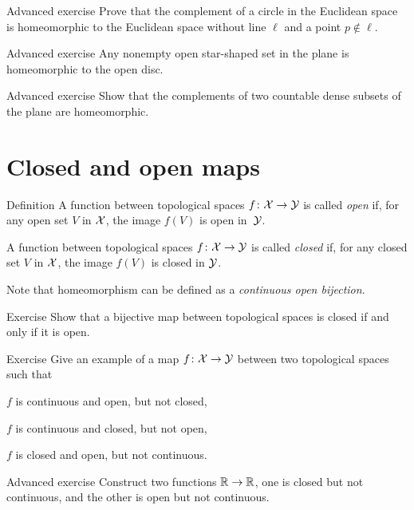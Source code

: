 \begin{thm}{Advanced exercise}
Prove that the complement of a circle in the Euclidean space is homeomorphic to the Euclidean space without line $\ell$ and a point $p\not\in\ell$.
\end{thm}

\begin{thm}{Advanced exercise}
Any nonempty open star-shaped set in the plane is homeomorphic to the open disc.
\end{thm}

\begin{thm}{Advanced exercise}
Show that the complements of two countable dense subsets of the plane are homeomorphic.
\end{thm}

\section{Closed and open maps}

\begin{thm}{Definition}\label{def:open-closed-maps}
A function between topological spaces 
$f\colon\mathcal{X}\to\mathcal{Y}$ is called \emph{open} if, for any open set $V$ in $\mathcal{X}$, the image $f(V)$ is open in~$\mathcal{Y}$.

A function between topological spaces 
$f\colon\mathcal{X}\to\mathcal{Y}$ is called \emph{closed} if, for any closed set $V$ in $\mathcal{X}$, the image $f(V)$ is closed in $\mathcal{Y}$.
\end{thm}

Note that homeomorphism can be defined as a \emph{continuous open bijection}.

\begin{thm}{Exercise}
Show that a bijective map between topological spaces is closed if and only if it is open.
\end{thm}

\begin{thm}{Exercise}
Give an example of a map $f\colon\mathcal{X}\to\mathcal{Y}$ between two topological spaces such that 
\begin{subthm}{}
$f$ is continuous and open, but not closed,
\end{subthm}

\begin{subthm}{}
$f$ is continuous and closed, but not open,
\end{subthm}

\begin{subthm}{}
$f$ is closed and open, but not continuous.
\end{subthm}

\end{thm}

\begin{thm}{Advanced exercise}
Construct two functions $\mathbb{R}\to\mathbb{R}$, one is closed but not continuous, and the other is open but not continuous.
\end{thm}


